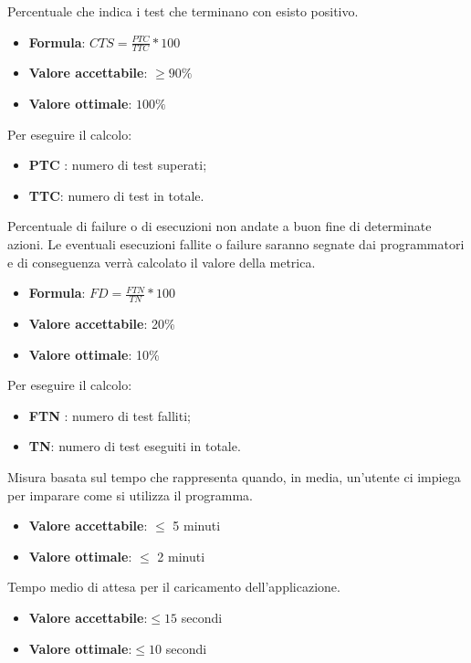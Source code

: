 Percentuale che indica i test che terminano con esisto positivo.
\begin{itemize}
    \item \textbf{Formula}: $CTS=\frac{PTC}{TTC}*100$
    \item \textbf{Valore accettabile}: $\geq90\%$
    \item \textbf{Valore ottimale}: $100\%$
\end{itemize}
Per eseguire il calcolo:
\begin{itemize}
    \item \textbf{PTC} : numero di test superati;
    \item \textbf{TTC}: numero di test in totale.
\end{itemize} 

Percentuale di failure o di esecuzioni non andate a buon fine di determinate azioni. Le
eventuali esecuzioni fallite o failure saranno segnate dai programmatori e di conseguenza verrà calcolato
il valore della metrica.
\begin{itemize}
    \item \textbf{Formula}: $FD=\frac{FTN}{TN}*100$
    \item \textbf{Valore accettabile}: 20\%
    \item \textbf{Valore ottimale}: 10\%
\end{itemize}  
Per eseguire il calcolo:
\begin{itemize}
    \item \textbf{FTN} : numero di test falliti;
    \item \textbf{TN}: numero di test eseguiti in totale.
\end{itemize}

Misura basata sul tempo che rappresenta quando, in media, un'utente ci impiega per imparare come si utilizza il programma.
\begin{itemize}
    \item \textbf{Valore accettabile}: $\leq$ 5 minuti
    \item \textbf{Valore ottimale}: $\leq$ 2 minuti
\end{itemize}  

Tempo medio di attesa per il caricamento dell'applicazione.
\begin{itemize}
    \item \textbf{Valore accettabile}:$\leq15$ secondi
    \item \textbf{Valore ottimale}:$\leq10$ secondi
\end{itemize} 

